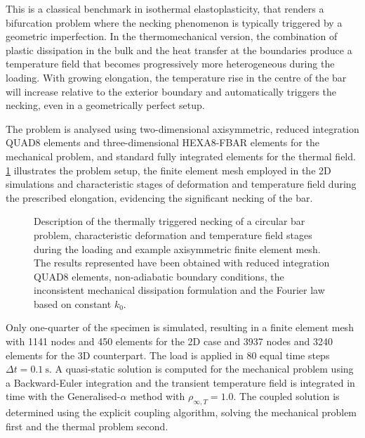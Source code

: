 %
This is a classical benchmark in isothermal elastoplasticity, that renders a bifurcation problem where the necking phenomenon is typically triggered by a geometric imperfection.
In the thermomechanical version, the combination of plastic dissipation in the bulk and the heat transfer at the boundaries produce a temperature field that becomes progressively more heterogeneous during the loading.
With growing elongation, the temperature rise in the centre of the bar will increase relative to the exterior boundary and automatically triggers the necking, even in a geometrically perfect setup.

The problem is analysed using two-dimensional axisymmetric, reduced integration QUAD8 elements and three-dimensional HEXA8-FBAR elements \cite{desouzaneto1996DesignSimpleLow} for the mechanical problem, and standard fully integrated elements for the thermal field.
\ref{fig:necking} illustrates the problem setup, the finite element mesh employed in the 2D simulations and characteristic stages of deformation and temperature field during the prescribed elongation, evidencing the significant necking of the bar.
%
\begin{figure}[p]
  \centering
  \caption{Description of the thermally triggered necking of a circular bar problem, characteristic deformation and temperature field stages during the loading and example axisymmetric finite element mesh. The results represented have been obtained with reduced integration QUAD8 elements, non-adiabatic boundary conditions, the inconsistent mechanical dissipation formulation and the Fourier law based on constant $k_{0}$.}
  \label{fig:necking}
\end{figure}
%
Only one-quarter of the specimen is simulated, resulting in a finite element mesh with 1141 nodes and 450 elements for the 2D case and  3937 nodes and 3240 elements for the 3D counterpart.
The load is applied in 80 equal time steps $\Delta t = \SI{0.1}{\second}$.
A quasi-static solution is computed for the mechanical problem using a Backward-Euler integration and the transient temperature field is integrated in time with the Generalised-$\alpha$ method with $\rho_{\infty,T}=1.0$.
The coupled solution is determined using the explicit coupling algorithm, solving the mechanical problem first and the thermal problem second.

